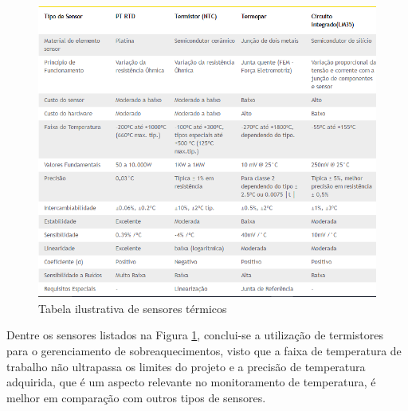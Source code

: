 \begin{figure}[!h]
	\centering
	\includegraphics[width=1.0\textwidth]{figuras/tabelaSensoresTermicos.png}
	\caption{Tabela ilustrativa de sensores térmicos}
	\label{fig:sensorestermicos}
\end{figure}

Dentre os sensores listados na Figura \ref{fig:sensorestermicos}, conclui-se a utilização de termistores para o gerenciamento de sobreaquecimentos, visto que a faixa de temperatura de trabalho não ultrapassa os limites do projeto e a precisão de temperatura adquirida, que é um aspecto relevante no monitoramento de temperatura, é melhor em comparação com outros tipos de sensores.


